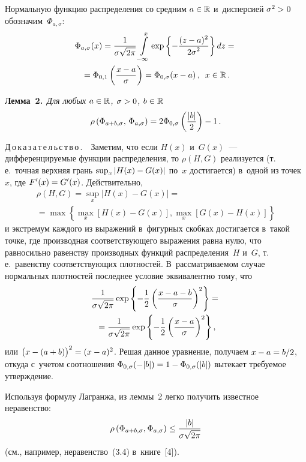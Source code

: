 \begin{multicols}{2}
 Нормальную функцию распределения со средним $a\hm\in\mathbb{R}$ и~дисперсией 
$\sigma^2\hm>0$ обозначим~$\Phi_{a,\sigma}$:
\begin{multline*}
\Phi_{a,\sigma}(x)=\displaystyle\frac{\displaystyle 1\mathstrut}{\displaystyle \sigma\sqrt{2\pi}\mathstrut}
\int\limits_{-\infty}^{x}\exp\left\{-\displaystyle\frac{\displaystyle (z-a)^2\mathstrut}{\displaystyle 2\sigma^2\mathstrut}\right\}dz={}\\
{}=
\Phi_{0,1}\left(\displaystyle\frac{\displaystyle x-a\mathstrut}{\displaystyle \sigma\mathstrut}\right)=
\Phi_{0,\sigma}(x-a)\,,\enskip x\in\mathbb{R}\,.
\end{multline*}

\smallskip

\noindent
\textbf{Лемма~2.}\ \textit{Для любых $a\hm\in\mathbb{R}$, $\sigma\hm>0$, $b\hm\in\mathbb{R}$}
$$
\rho\left(\Phi_{a+b,\sigma},\,\Phi_{a,\sigma}\right)= 
2\Phi_{0,\sigma}\left(\displaystyle\frac{\displaystyle |b|\mathstrut}{\displaystyle 2\mathstrut}\right)-1\,.
$$

\smallskip

\noindent
Д\,о\,к\,а\,з\,а\,т\,е\,л\,ь\,с\,т\,в\,о\,.\ \
 Заметим, что если $H(x)$ и~$G(x)$~--- дифференцируемые функции распределения, то $\rho(H,G)$ 
 реализуется (т.\,е.\ точная верхняя грань $\sup_x|H(x)\hm-G(x)|$ по~$x$ достигается) в~одной из точек~$x$, 
 где $F'(x)\hm=G'(x)$. Действительно,
\begin{multline*}
\rho(H,G)=\sup\limits_x|H(x)-G(x)|={}\\
{}=\max\left\{\max\limits_x\left[H(x)-G(x)\right], 
\max\limits_x\left[G(x)-H(x)\right]\right\}
\end{multline*}
и экстремум каждого из выражений в~фигурных скобках достигается в~такой точке, где производная 
соответствующего выражения равна нулю, что равносильно равенству производных функций 
распределения~$H$ и~$G$, т.\,е.\ равенству соответствующих плотностей. 
В~рассматриваемом случае нормальных плотностей последнее условие эквивалентно тому, что
\begin{multline*}
\displaystyle\frac{\displaystyle 1\mathstrut}{\displaystyle \sigma\sqrt{2\pi}\mathstrut}\exp\left\{-\displaystyle\frac{\displaystyle 1\mathstrut}{\displaystyle 2\mathstrut}\left(\displaystyle\frac{\displaystyle x-a-b\mathstrut}{\displaystyle \sigma\mathstrut}\right)^2\right\}={}\\
{}=
\displaystyle\frac{\displaystyle 1\mathstrut}{\displaystyle \sigma\sqrt{2\pi}\mathstrut}\exp\left\{-\displaystyle\frac{\displaystyle 1\mathstrut}{\displaystyle 2\mathstrut}\left(\displaystyle\frac{\displaystyle x-a\mathstrut}{\displaystyle \sigma\mathstrut}\right)^2\right\},
\end{multline*}
или $\big(x-(a+b)\big)^2\hm=(x-a)^2$. Решая данное уравнение, получаем $x\hm-a\hm={b}/{2}$, 
откуда с~учетом соотношения $\Phi_{0,\sigma}(-|b|)\hm=1-\Phi_{0,\sigma}(|b|)$ вытекает требуемое утверждение.

\smallskip

Используя формулу Лагранжа, из леммы~2 легко получить известное неравенство:
$$
\rho\left(\Phi_{a+b,\sigma},\Phi_{a,\sigma}\right)\le \displaystyle\frac{\displaystyle |b|\mathstrut}{\displaystyle \sigma\sqrt{2\pi}\mathstrut}
$$
(см., например, неравенство~(3.4) в~книге~[4]).


\end{multicols}
